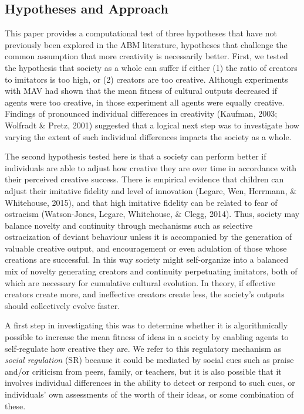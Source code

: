 \documentclass[a4paper,12pt,man,british]{apa6}
\begin{document}
\subsection{Hypotheses and Approach}
This paper provides a computational test of three hypotheses that have not previously been explored in the ABM literature, hypotheses that challenge the common assumption that more creativity is necessarily better. First, we tested the hypothesis that society as a whole can suffer if either (1) the ratio of creators to imitators is too high, or (2) creators are too creative. Although experiments with MAV had shown that the mean fitness of cultural outputs decreased if agents were too creative, in those experiment all agents were equally creative. Findings of pronounced individual differences in creativity (Kaufman, 2003; Wolfradt \& Pretz, 2001) suggested that a logical next step was to investigate how varying the extent of such individual differences impacts the society as a whole. 

The second hypothesis tested here is that a society can perform better if individuals are able to adjust how creative they are over time in accordance with their perceived creative success. There is empirical evidence that children can adjust their imitative fidelity and level of innovation (Legare, Wen, Herrmann, \& Whitehouse, 2015), and that high imitative fidelity can be related to fear of ostracism (Watson-Jones, Legare, Whitehouse, \& Clegg, 2014). Thus, society may balance novelty and continuity through mechanisms such as selective ostracization of deviant behaviour unless it is accompanied by the generation of valuable creative output, and encouragement or even adulation of those whose creations are successful. In this way society might self-organize into a balanced mix of novelty generating creators and continuity perpetuating imitators, both of which are necessary for cumulative cultural evolution. In theory, if effective creators create more, and ineffective creators create less, the society's outputs should collectively evolve faster. 

A first step in investigating this was to determine whether it is algorithmically possible to increase the mean fitness of ideas in a society by enabling agents to self-regulate how creative they are. We refer to this regulatory mechanism as \emph{social regulation} (SR) because it could be mediated by social cues such as praise and/or criticism from peers, family, or teachers, but it is also possible that it involves individual differences in the ability to detect or respond to such cues, or individuals' own assessments of the worth of their ideas, or some combination of these.
\end{document}
